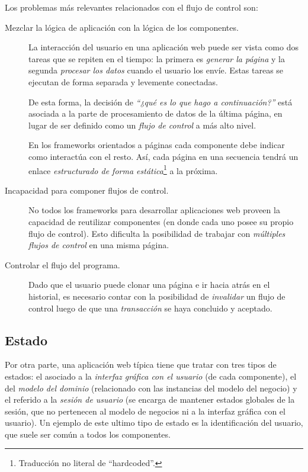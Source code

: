 Los problemas más relevantes relacionados con el flujo de control son:

\begin{description}

\item[Mezclar la lógica de aplicación con la lógica de los componentes.]

La interacción del usuario en una aplicación web puede ser vista como dos tareas que se repiten en el tiempo: la primera es \emph{generar la página} y la segunda \emph{procesar los datos} cuando el usuario los envíe. Estas tareas se ejecutan de forma separada y levemente conectadas.

De esta forma, la decisión de \emph{``¿qué es lo que hago a continuación?''} está asociada a la parte de procesamiento de datos de la última página, en lugar de ser definido como un \emph{flujo de control} a más alto nivel.

En los frameworks orientados a páginas cada componente debe indicar como interactúa con el resto. Así, cada página en una secuencia tendrá un enlace \emph{estructurado de forma estática}\footnote{Traducción no literal de ``hardcoded''.} a la próxima.

\item[Incapacidad para componer flujos de control.]

No todos los frameworks para desarrollar aplicaciones web proveen la capacidad de reutilizar componentes (en donde cada uno posee su propio flujo de control). Esto dificulta la posibilidad de trabajar con \emph{múltiples flujos de control} en una misma página.

\item[Controlar el flujo del programa.]

Dado que el usuario puede clonar una página e ir hacia atrás en el historial, es necesario contar con la posibilidad de \emph{invalidar} un flujo de control luego de que una \emph{transacción} se haya concluido y aceptado.

\end{description}


\subsection{Estado}
\label{ControlFlowStates}

Por otra parte, una aplicación web típica tiene que tratar con tres tipos de estados: el asociado a la \emph{interfaz gráfica con el usuario} (de cada componente), el del \emph{modelo del dominio} (relacionado con las instancias del modelo del negocio) y el referido a la \emph{sesión de usuario} (se encarga de mantener estados globales de la sesión, que no pertenecen al modelo de negocios ni a la interfaz gráfica con el usuario). Un ejemplo de este ultimo tipo de estado es la identificación del usuario, que suele ser común a todos los componentes.

